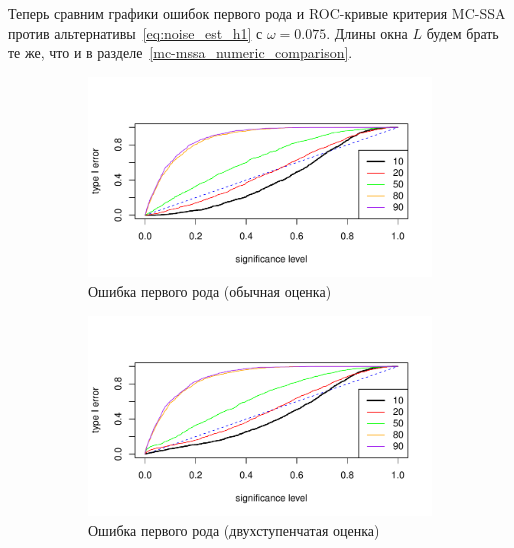 \documentclass[specialist,
substylefile = spbu_report.rtx,
subf,href,colorlinks=true, 12pt]{disser}
\theoremstyle{definition}
\begin{document}
Теперь сравним графики ошибок первого рода и ROC-кривые критерия MC-SSA против альтернативы~\eqref{eq:noise_est_h1} с $\omega=0.075$. Длины окна $L$ будем брать те же, что и в разделе~\ref{mc-mssa_numeric_comparison}.

\begin{figure}[h!]
	\captionsetup[subfigure]{justification=Centering}
	\begin{subfigure}[t]{0.5\textwidth}
		\centering
		\includegraphics[width=\textwidth]{img/type1error_arima.pdf}
		\caption{Ошибка первого рода (обычная оценка)}
		\label{fig:arima_type1error}
	\end{subfigure}\hspace{\fill}
	\begin{subfigure}[t]{0.5\textwidth}
		\centering
		\includegraphics[width=\textwidth]{img/type1error_extract.pdf}
		\caption{Ошибка первого рода (двухступенчатая оценка)}
		\label{fig:extract_type1error}
	\end{subfigure}
	\bigskip
	\begin{subfigure}[t]{0.5\textwidth}
		\centering

\end{subfigure}
\end{figure}
\end{document}
